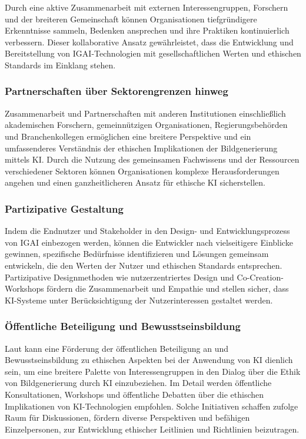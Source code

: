 \documentclass[12pt]{report}
\begin{document}
Durch eine aktive Zusammenarbeit mit externen Interessengruppen, Forschern und der breiteren Gemeinschaft können Organisationen tiefgründigere Erkenntnisse sammeln, Bedenken ansprechen und ihre Praktiken kontinuierlich verbessern. Dieser kollaborative Ansatz gewährleistet, dass die Entwicklung und Bereitstellung von \ac{IGAI}-Technologien mit gesellschaftlichen Werten und ethischen Standards im Einklang stehen.\cite{EUCommision}\cite{UNESCO}

\subsubsection{Partnerschaften über Sektorengrenzen hinweg}
Zusammenarbeit und Partnerschaften mit anderen Institutionen einschließlich akademischen Forschern, gemeinnützigen Organisationen, Regierungsbehörden und Branchenkollegen ermöglichen eine breitere Perspektive und ein umfassenderes Verständnis der ethischen Implikationen der Bildgenerierung mittels \ac{KI}. Durch die Nutzung des gemeinsamen Fachwissens und der Ressourcen verschiedener Sektoren können Organisationen komplexe Herausforderungen angehen und einen ganzheitlicheren Ansatz für ethische KI sicherstellen.\cite{Vogel}

\subsubsection{Partizipative Gestaltung}
Indem die Endnutzer und Stakeholder in den Design- und Entwicklungsprozess von \ac{IGAI} einbezogen werden, können die Entwickler nach \cite{Zytko} vielseitigere Einblicke gewinnen, spezifische Bedürfnisse identifizieren und Lösungen gemeinsam entwickeln, die den Werten der Nutzer und ethischen Standards entsprechen. Partizipative Designmethoden wie nutzerzentriertes Design und Co-Creation-Workshops fördern die Zusammenarbeit und Empathie und stellen sicher, dass \ac{KI}-Systeme unter Berücksichtigung der Nutzerinteressen gestaltet werden.

\subsubsection{Öffentliche Beteiligung und Bewusstseinsbildung}
Laut \cite{WILSON2022101652} kann eine Förderung der öffentlichen Beteiligung an und Bewusstseinsbildung zu ethischen Aspekten bei der Anwendung von \ac{KI} dienlich sein, um eine breitere Palette von Interessengruppen in den Dialog über die Ethik von Bildgenerierung durch \ac{KI} einzubeziehen. Im Detail werden öffentliche Konsultationen, Workshops und öffentliche Debatten über die ethischen Implikationen von KI-Technologien empfohlen. Solche Initiativen schaffen \cite{WILSON2022101652} zufolge Raum für Diskussionen, fördern diverse Perspektiven und befähigen Einzelpersonen, zur Entwicklung ethischer Leitlinien und Richtlinien beizutragen.
\end{document}
